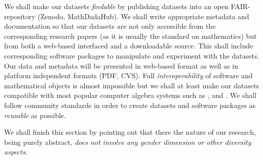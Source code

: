 We shall make our datasets \emph{findable} by publishing datasets into an open FAIR-repository (Zenodo, MathDadaHub). We shall write appropriate metadata and documentation so that our datasets are not only accessible from the corresponding research papers (as it is usually the standard on mathematics) but from both a web-based interfaced and a downloadable source.
This shall include corresponding software packages to manipulate and experiment with the datasets. Our data and metadata will be presented in web-based format as well as in platform independent formats (PDF, CVS).
Full \emph{interoperability} of software and mathematical objects is almost impossible but we shall at least make our datasets compatible with most popular computer algebra systems such as \gap, \sage and \magma.
We shall follow community standards in order to create datasets and software packages as \emph{reusable} as possible.

We shall finish this section by pointing out that there the nature of our research, being purely abstract, \emph{does not involve any gender dimension or other diversity aspects.}





%
